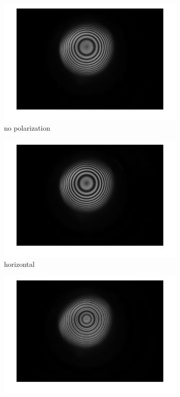 \documentclass[a4paper,12pt]{article}
\begin{document}
    \begin{figure}[H]
        \centering
        \begin{subfigure}[b]{0.3\textwidth}
            \includegraphics[width=1.2\textwidth]{tra_ano_none.png}
            \caption{no polarization}
        \end{subfigure}
        \space
        \begin{subfigure}[b]{0.3\textwidth}
            \includegraphics[width=1.2\textwidth]{tra_ano_hor.png}
            \caption{horizontal}
        \end{subfigure}
        \space
        \begin{subfigure}[b]{0.3\textwidth}
            \includegraphics[width=1.2\textwidth]{tra_ano_ver.png}

\end{subfigure}
\end{figure}
\end{document}
